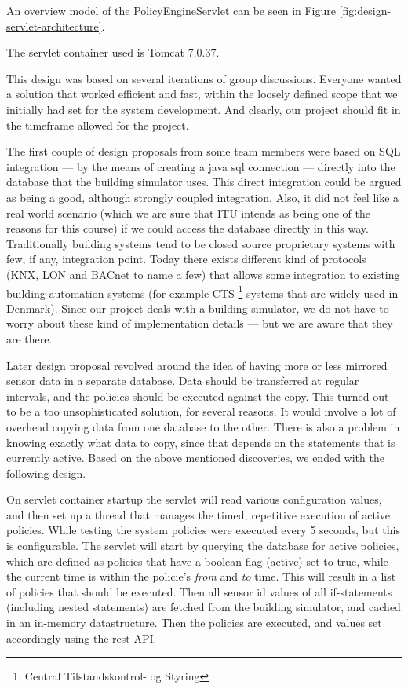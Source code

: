 An overview model of the PolicyEngineServlet can be seen in Figure \ref{fig:design-servlet-architecture}.

The servlet container used is Tomcat 7.0.37. 

This design was based on several iterations of group discussions. Everyone wanted a solution that worked efficient and fast, within the loosely defined scope that we initially had set for the system development. And clearly, our project should fit in the timeframe allowed for the project.

The first couple of design proposals from some team members were based on SQL integration --- by the means of creating a java sql connection --- directly into the database that the building simulator uses. This direct integration could be argued as being a good, although strongly coupled integration. Also, it did not feel like a real world scenario (which we are sure that ITU intends as being one of the reasons for this course) if we could access the database directly in this way. Traditionally building systems tend to be closed source proprietary systems with few, if any, integration point. Today there exists different kind of protocols (KNX, LON and BACnet to name a few) that allows some integration to existing building automation systems (for example CTS \footnote{Central Tilstandskontrol- og Styring} systems that are widely used in Denmark). Since our project deals with a building simulator, we do not have to worry about these kind of implementation details --- but we are aware that they are there.

Later design proposal revolved around the idea of having more or less mirrored sensor data in a separate database. Data should be transferred at regular intervals, and the policies should be executed against the copy. This turned out to be a too unsophisticated solution, for several reasons. It would involve a lot of overhead copying data from one database to the other. There is also a problem in knowing exactly what data to copy, since that depends on the statements that is currently active. Based on the above mentioned discoveries, we ended with the following design. 

On servlet container startup the servlet will read various configuration values, and then set up a thread that manages the timed, repetitive execution of active policies. While testing the system policies were executed every 5 seconds, but this is configurable. The servlet will start by querying the database for active policies, which are defined as policies that have a boolean flag (active) set to true, while the current time is within the policie's \textit{from} and \textit{to} time. This will result in a list of policies that should be executed. Then all sensor id values of all if-statements (including nested statements) are fetched from the building simulator, and cached in an in-memory datastructure. Then the policies are executed, and values set accordingly using the rest API.

